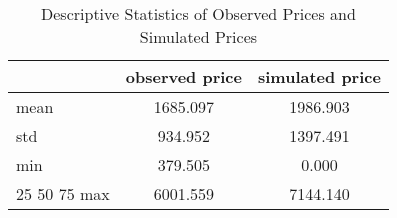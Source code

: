 \begin{table}[H]
\centering
\caption{Descriptive Statistics of Observed Prices and Simulated Prices}
\label{table: fit_of_model}
\begin{tabular}{lcc}
\toprule
 & observed price & simulated price \\
\midrule
mean & 1685.097 & 1986.903 \\
std & 934.952 & 1397.491 \\
min & 379.505 & 0.000 \\
25%
50%
75%
max & 6001.559 & 7144.140 \\
\bottomrule
\end{tabular}
\end{table}
